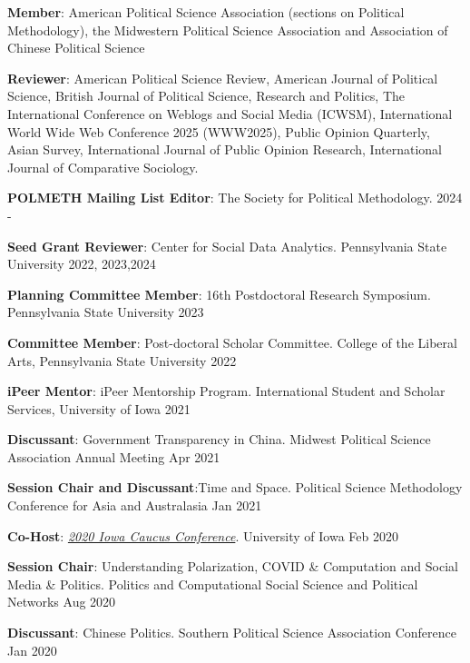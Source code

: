 \documentclass[10.5pt,]{article}
\providecommand{\tightlist}{%
	\setlength{\itemsep}{0pt}\setlength{\parskip}{0pt}}
\renewenvironment{itemize}{
	\begin{list}{}{
			\setlength{\leftmargin}{1.5em}
		}
	}{
	\end{list}
}
\begin{document}
\begin{itemize}
\tightlist
\item
  \textbf{Member}: American Political Science Association (sections on
  Political Methodology), the Midwestern Political Science Association
  and Association of Chinese Political Science
\item
  \textbf{Reviewer}: American Political Science Review, American Journal
  of Political Science, British Journal of Political Science, Research
  and Politics, The International Conference on Weblogs and Social Media
  (ICWSM), International World Wide Web Conference 2025 (WWW2025),
  Public Opinion Quarterly, Asian Survey, International Journal of
  Public Opinion Research, International Journal of Comparative
  Sociology.
\item
  \textbf{POLMETH Mailing List Editor}: The Society for Political
  Methodology. \hfill 2024 -
\item
  \textbf{Seed Grant Reviewer}: Center for Social Data Analytics.
  Pennsylvania State University \hfill 2022, 2023,2024
\item
  \textbf{Planning Committee Member}: 16th Postdoctoral Research
  Symposium. Pennsylvania State University \hfill2023
\item
  \textbf{Committee Member}: Post-doctoral Scholar Committee. College of
  the Liberal Arts, Pennsylvania State University \hfill 2022
\item
  \textbf{iPeer Mentor}: iPeer Mentorship Program. International Student
  and Scholar Services, University of Iowa \hfill 2021
\item
  \textbf{Discussant}: Government Transparency in China. Midwest
  Political Science Association Annual Meeting \hfill Apr 2021
\item
  \textbf{Session Chair and Discussant}:Time and Space. Political
  Science Methodology Conference for Asia and Australasia \hfill  Jan
  2021
\item
  \textbf{Co-Host}:
  \href{https://clas.uiowa.edu/polisci/Shambaugh-2020Caucus}{\emph{2020
  Iowa Caucus Conference}}. University of Iowa \hfill Feb 2020
\item
  \textbf{Session Chair}: Understanding Polarization, COVID \&
  Computation and Social Media \& Politics. Politics and Computational
  Social Science and Political Networks \hfill Aug 2020
\item
  \textbf{Discussant}: Chinese Politics. Southern Political Science
  Association Conference \hfill Jan 2020
\end{itemize}
\end{document}
